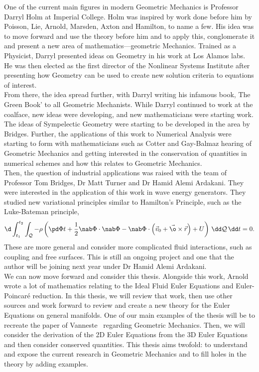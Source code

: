 \noindent
One of the current main figures in modern Geometric Mechanics is Professor Darryl Holm at Imperial College. Holm was inspired by work done before him by Poisson, Lie, Arnold, Marsden, Axton and Hamilton, to name a few. His idea was to move forward and use the theory before him and to apply this, conglomerate it and present a new area of mathematics—geometric Mechanics. Trained as a Physicist, Darryl presented ideas on Geometry in his work at Los Alamos labs. He was then elected as the first director of the Nonlinear Systems Institute after presenting how Geometry can be used to create new solution criteria to equations of interest.\\

\noindent
From there, the idea spread further, with Darryl writing his infamous book, The Green Book' to all Geometric Mechanists. While Darryl continued to work at the coalface, new ideas were developing, and new mathematicians were starting work. The ideas of Sympelectic Geometry were starting to be developed in the area by Bridges. Further, the applications of this work to Numerical Analysis were starting to form with mathematicians such as Cotter and Gay-Balmaz hearing of Geometric Mechanics and getting interested in the conservation of quantities in numerical schemes and how this relates to Geometric Mechanics. \\

\noindent
Then, the question of industrial applications was raised with the team of Professor Tom Bridges, Dr Matt Turner and Dr Hamid Alemi Ardakani. They were interested in the application of this work in wave energy generators. They studied new variational principles similar to Hamilton's Principle, such as the Luke-Bateman principle,
$$ \d\int_{t_1}^{t_2}\int_{\mathcal{Q}} - \rho \left( \pd \Phi t + \frac{1}{2}\nab\Phi \cdot \nab \Phi - \nab\Phi \cdot \left( \vec v_0 + \vec \o \times \vec r \right) + U \right)\, \dd \mathcal{Q}\,\dd t = 0. $$
These are more general and consider more complicated fluid interactions, such as coupling and free surfaces. This is still an ongoing project and one that the author will be joining next year under Dr Hamid Alemi Ardakani.\\

\noindent
We can now move forward and consider this thesis. Alongside this work, Arnold wrote a lot of mathematics relating to the Ideal Fluid Euler Equations and Euler-Poincar\'e reduction. In this thesis, we will review that work, then use other sources and work forward to review and create a new theory for the Euler Equations on general manifolds. One of our main examples of the thesis will be to recreate the paper of Vanneste~\cite{vanneste_2021} regarding Geometric Mechanics. Then, we will consider the derivation of the 2D Euler Equations from the 3D Euler Equations and then consider conserved quantities. This thesis aims twofold: to understand and expose the current research in Geometric Mechanics and to fill holes in the theory by adding examples.\\

